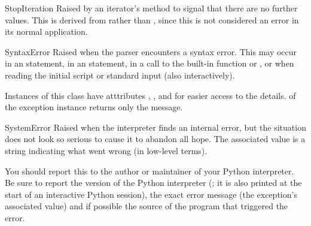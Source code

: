 \begin{excdesc}{StopIteration}
  Raised by an iterator's  method to signal that there
  are no further values.
  This is derived from  rather than
  , since this is not considered an error in
  its normal application.
\end{excdesc}

\begin{excdesc}{SyntaxError}
  Raised when the parser encounters a syntax error.  This may occur in
  an  statement, in an  statement, in a call
  to the built-in function  or , or
  when reading the initial script or standard input (also
  interactively).

  Instances of this class have atttributes ,
  ,  and  for easier access
  to the details.   of the exception instance returns
  only the message.
\end{excdesc}

\begin{excdesc}{SystemError}
  Raised when the interpreter finds an internal error, but the
  situation does not look so serious to cause it to abandon all hope.
  The associated value is a string indicating what went wrong (in
  low-level terms).
  
  You should report this to the author or maintainer of your Python
  interpreter.  Be sure to report the version of the Python
  interpreter (; it is also printed at the start of an
  interactive Python session), the exact error message (the exception's
  associated value) and if possible the source of the program that
  triggered the error.
\end{excdesc}

